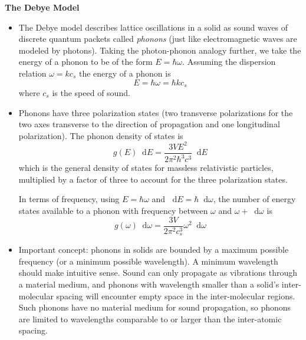 \documentclass[11pt, a4paper]{article}
\newcommand{\diff}{\mathop{}\!\mathrm{d}} %
\begin{document}
\smallskip
\textbf{The Debye Model}
\begin{itemize}
	\item The Debye model describes lattice oscillations in a solid as sound waves of discrete quantum packets called \textit{phonons} (just like electromagnetic waves are modeled by photons). Taking the photon-phonon analogy further, we take the energy of a phonon to be of the form $ E = \hbar \omega $. Assuming the dispersion relation $ \omega = k c_{s} $ the energy of a phonon is
	\begin{equation*}
		E = \hbar \omega = \hbar k c_{s}
	\end{equation*}
	where $ c_{s} $ is the speed of sound.
	
	\item Phonons have three polarization states (two transverse polarizations for the two axes transverse to the direction of propagation and one longitudinal polarization). The phonon density of states is
	\begin{equation*}
		g(E)\diff E = \frac{3VE^{2}}{2\pi^{2}\hbar^{3}c^{3}} \diff E
	\end{equation*}
	which is the general density of states for massless relativistic particles, multiplied by a factor of three to account for the three polarization states.
	
	In terms of frequency, using $ E = \hbar \omega $ and $ \diff E = \hbar \diff \omega $, the number of energy states available to a phonon with frequency between $ \omega  $ and $ \omega + \diff \omega $ is 
	\begin{equation*}
		g(\omega)\diff \omega = \frac{3V}{2\pi^{2}c_{s}^{3}} \omega^{2} \diff \omega
	\end{equation*}
	
	\item Important concept: phonons in solids are bounded by a maximum possible frequency (or a minimum possible wavelength). A minimum wavelength should make intuitive sense. Sound can only propagate as vibrations through a material medium, and phonons with wavelength smaller than a solid's inter-molecular spacing will encounter empty space in the inter-molecular regions. Such phonons have no material medium for sound propagation, so phonons are limited to wavelengths comparable to or larger than the inter-atomic spacing. 
	

\end{itemize}
\end{document}
